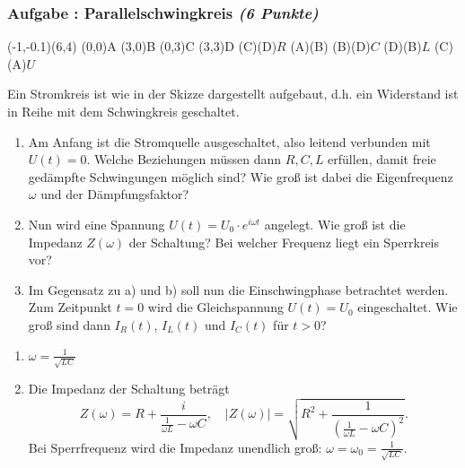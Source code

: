 \documentclass[12pt,a4paper]{article}
\newenvironment{abcenum}{\renewcommand{\labelenumi}{(\alph{enumi})} \begin{enumerate}}{\end{enumerate}\renewcommand{\labelenumi}{\theenumi .}}
\newcommand{\skizze}[1]{
\begin{center}
#1
\end{center}
}
\newcounter{numlabel}
\newenvironment{problem}[2]{\stepcounter{numlabel} \vspace{1ex} \subsubsection*{Aufgabe \the\value{numlabel}: #1 \emph{(#2 Punkte)}} \renewcommand{\Currentlabel}{Aufgabe \the\value{numlabel}: #1}}{

}
\begin{document}
\begin{problem}{Parallelschwingkreis}{6}
\skizze{
\begin{pspicture}(-1,-0.1)(6,4)
\pnode(0,0){A}
\pnode(3,0){B}
\pnode(0,3){C}
\pnode(3,3){D}
\resistor(C)(D){$R$}
\wire(A)(B)
\capacitor[labeloffset=1](B)(D){$C$}
\coil[parallel,labeloffset=1](D)(B){$L$}
\tension(C)(A){$U$}
\end{pspicture}
}
Ein Stromkreis ist wie in der Skizze dargestellt aufgebaut, d.h. ein Widerstand ist in Reihe mit dem Schwingkreis geschaltet.
\begin{abcenum}
\item
Am Anfang ist die Stromquelle ausgeschaltet, also leitend verbunden mit $U(t) = 0$. Welche Beziehungen müssen dann $R,C,L$ erfüllen, damit freie gedämpfte Schwingungen möglich sind? Wie groß ist dabei die Eigenfrequenz $\omega$ und der Dämpfungsfaktor?
\item Nun wird eine Spannung $U(t)=U_0\cdot e^{i\omega t}$ angelegt. Wie groß ist die Impedanz $Z(\omega)$ der Schaltung? Bei welcher Frequenz liegt ein Sperrkreis vor?
\item Im Gegensatz zu a) und b) soll nun die Einschwingphase betrachtet werden. Zum Zeitpunkt $t = 0$ wird die Gleichspannung $U(t)=U_0$ eingeschaltet. Wie groß sind dann $I_R(t)$, $I_L(t)$ und $I_C(t)$ für $t>0$?
\end{abcenum}

\begin{solution}
\begin{abcenum}
\item $\omega=\frac{1}{\sqrt{LC}}$
\item Die Impedanz der Schaltung beträgt
\[
Z(\omega)=R+\frac{i}{\frac{1}{\omega L}-\omega C}, \quad
|Z(\omega)|=\sqrt{R^2+\frac{1}{\left(\frac{1}{\omega L}-\omega C\right)^2}}.
\]
Bei Sperrfrequenz wird die Impedanz unendlich groß: $ \omega=\omega_0=\frac{1}{\sqrt{LC}} $.
\end{abcenum}
\end{solution}
\end{problem}
\end{document}
